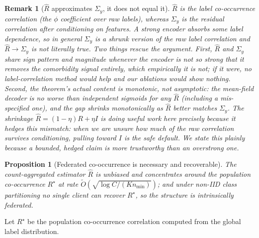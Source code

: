 \documentclass[11pt,a4paper]{article}
\newtheorem{proposition}{Proposition}
\newtheorem{remark}{Remark}
\theoremstyle{definition}
\newcommand{\Rhat}{\widehat{R}}
\newcommand{\Sigmay}{\Sigma_{y}}
\begin{document}
\begin{remark}[$\Rhat$ approximates $\Sigmay$, it does not equal it]
\label{rmk:caveat}
$\Rhat$ is the label co-occurrence correlation (the $\phi$ coefficient over raw labels), whereas $\Sigmay$ is the residual correlation after conditioning on features. A strong encoder absorbs some label dependence, so in general $\Sigmay$ is a shrunk version of the raw label correlation and $\Rhat\to\Sigmay$ is not literally true. Two things rescue the argument. First, $\Rhat$ and $\Sigmay$ share sign pattern and magnitude whenever the encoder is not so strong that it removes the comorbidity signal entirely, which empirically it is not; if it were, no label-correlation method would help and our ablations would show nothing. Second, the theorem's actual content is monotonic, not asymptotic: the mean-field decoder is no worse than independent sigmoids for any $\Rhat$ (including a mis-specified one), and the gap shrinks monotonically as $\Rhat$ better matches $\Sigmay$. The shrinkage $\Rhat=(1-\eta)R+\eta I$ is doing useful work here precisely because it hedges this mismatch: when we are unsure how much of the raw correlation survives conditioning, pulling toward $I$ is the safe default. We state this plainly because a bounded, hedged claim is more trustworthy than an overstrong one.
\end{remark}

\begin{proposition}[Federated co-occurrence is necessary and recoverable]
\label{prop:estimation}
The count-aggregated estimator $\Rhat$ is unbiased and concentrates around the population co-occurrence $R^{\star}$ at rate \allowbreak$\tilde O(\sqrt{\log C/(K n_{\min})})$; and under non-IID class partitioning no single client can recover $R^{\star}$, so the structure is intrinsically federated.
\end{proposition}

Let $R^{\star}$ be the population co-occurrence correlation computed from the global label distribution.
\end{document}
